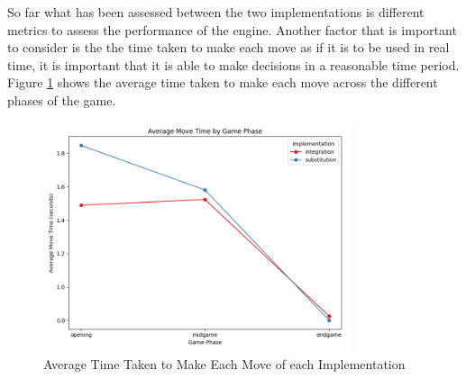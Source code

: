 So far what has been assessed between the two implementations is different metrics to assess the performance of the engine. Another factor that is important to consider is the the time taken to make each move as if it is to be used in real time, it is important that it is able to make decisions in a reasonable time period. Figure \ref{fig: implementation_vs_avg_move_time_and_phase} shows the average time taken to make each move across the different phases of the game.

\begin{figure}[H]
    \centering
    \includegraphics[width=0.8\textwidth]{images/plots/implementation/Implementation_vs_avg_move_time_and_phase.png}
    \caption{Average Time Taken to Make Each Move of each Implementation}
    \label{fig: implementation_vs_avg_move_time_and_phase}
\end{figure}


